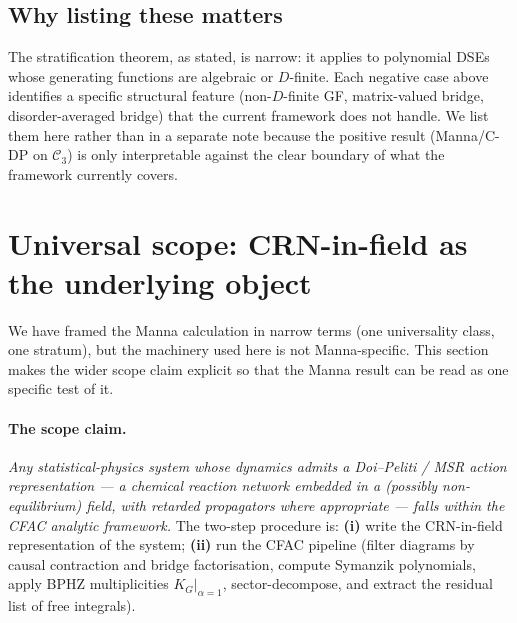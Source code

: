 \documentclass[10pt,a4paper,twocolumn]{article}
\theoremstyle{plain}
\theoremstyle{definition}
\newcommand{\Cstr}[1]{\mathcal{C}_{#1}}
\begin{document}
\subsection{Why listing these matters}
The stratification theorem, as stated, is narrow: it applies to
polynomial DSEs whose generating functions are algebraic or
$D$-finite.  Each negative case above identifies a specific
structural feature (non-$D$-finite GF, matrix-valued bridge,
disorder-averaged bridge) that the current framework does not
handle.  We list them here rather than in a separate note because
the positive result (Manna/C-DP on $\Cstr{3}$) is only
interpretable against the clear boundary of what the framework
currently covers.

\section{Universal scope: CRN-in-field as the underlying object}
\label{sec:scope}

We have framed the Manna calculation in narrow terms (one
universality class, one stratum), but the machinery used here is
not Manna-specific.  This section makes the wider scope claim
explicit so that the Manna result can be read as one specific test
of it.

\paragraph{The scope claim.}
\emph{Any statistical-physics system whose dynamics admits a
Doi--Peliti / MSR action representation --- a chemical reaction
network embedded in a (possibly non-equilibrium) field, with
retarded propagators where appropriate --- falls within the CFAC
analytic framework.}  The two-step procedure is:
\textbf{(i)} write the CRN-in-field representation of the system;
\textbf{(ii)} run the CFAC pipeline (filter diagrams by causal
contraction and bridge factorisation, compute Symanzik polynomials,
apply BPHZ multiplicities $K_G|_{\alpha=1}$, sector-decompose, and
extract the residual list of free integrals).
\end{document}
